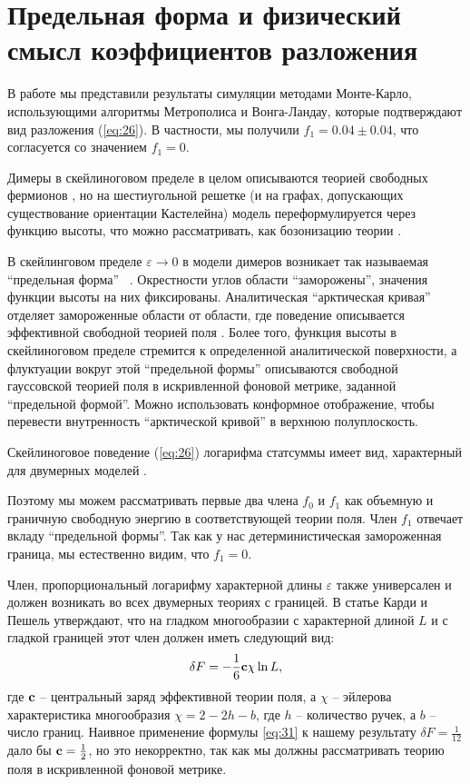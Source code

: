 \documentclass{article}
\begin{document}
\section{Предельная форма и физический смысл коэффициентов разложения}
\label{sec:accur-expans-phys}

В работе  \cite{1742-6596-1135-1-012024} мы представили результаты симуляции методами Монте-Карло,
использующими алгоритмы Метрополиса и Вонга-Ландау, которые подтверждают вид разложения
(\ref{eq:26}). В частности, мы получили $f_{1}=0.04\pm 0.04$, что согласуется со значением $f_{1}=0$. 

Димеры в скейлиноговом пределе в целом описываются теорией свободных фермионов
\cite{dijkgraaf2009dimer}, но на шестиугольной решетке (и на графах, допускающих существование
ориентации Кастелейна) модель переформулируется через функцию высоты, что можно рассматривать, как
бозонизацию теории \cite{gogolin2004bosonization}.

В скейлинговом пределе $\varepsilon\to 0$ в модели димеров возникает так называемая ``предельная форма''
~\cite{1998math......1068J,cohn1998shape}. Окрестности углов области ``заморожены'', значения
функции высоты на них фиксированы. Аналитическая ``арктическая кривая'' отделяет замороженные
области от области, где поведение описывается эффективной свободной теорией поля
\cite{kenyon2009lectures,kenyon2008height,kenyon2006dimers}. Более того, функция высоты в
скейлиноговом пределе стремится к определенной аналитической поверхности, а флуктуации вокруг этой
``предельной формы'' описываются свободной гауссовской теорией поля в искривленной фоновой метрике,
заданной ``предельной формой''. Можно использовать конформное отображение, чтобы перевести
внутренность ``арктической кривой'' в верхнюю полуплоскость.

Скейлиноговое поведение (\ref{eq:26}) логарифма статсуммы имеет вид, характерный для двумерных
моделей \cite{cardy1988finite}. 

Поэтому мы можем рассматривать первые два члена $f_{0}$ и $f_{1}$ как объемную и граничную свободную
энергию в соответствующей теории поля. Член $f_1$ отвечает вкладу ``предельной формы''. Так как у
нас детерминистическая замороженная граница, мы естественно видим, что $f_{1}=0$.

Член, пропорциональный логарифму характерной длины $\varepsilon$ также универсален
\cite{cardy1988finite} и должен возникать во всех двумерных теориях с границей. В статье
\cite{cardy1988finite} Карди и Пешель утверждают, что на гладком многообразии с характерной длиной
$L$ и с гладкой границей этот член должен иметь следующий вид:
\begin{equation}
  \label{eq:31}
  \delta F = -\frac{1}{6}{\bf c} \chi \ln L,
\end{equation}
где  ${\bf c}$ -- центральный заряд эффективной теории поля, а $\chi$ -- эйлерова характеристика
многообразия  $\chi=2-2 h-b$, где  $h$ -- количество ручек, а  $b$ -- число границ. Наивное
применение формулы  \eqref{eq:31} к нашему результату $\delta F=\frac{1}{12}$ дало бы ${\bf
  c}=\frac{1}{2}$, но это некорректно, так как мы должны рассматривать теорию поля в искривленной
фоновой метрике.
\end{document}
